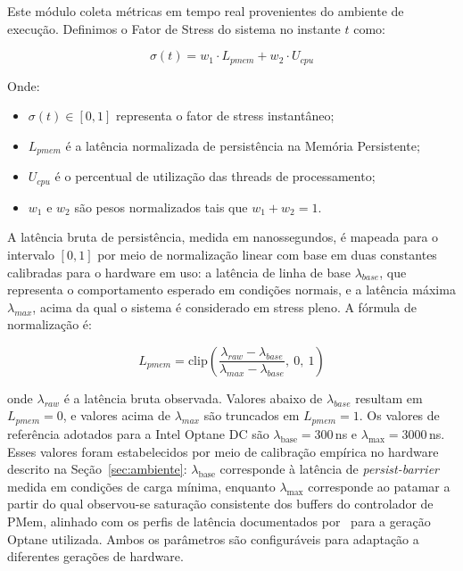 Este módulo coleta métricas em tempo real provenientes do ambiente de execução.
Definimos o Fator de Stress do sistema no instante $t$ como:

\begin{equation}
    \sigma(t) = w_1 \cdot L_{pmem} + w_2 \cdot U_{cpu}
    \label{eq:stress}
\end{equation}

\noindent Onde:
\begin{itemize}
    \item $\sigma(t) \in [0, 1]$ representa o fator de stress instantâneo;
    \item $L_{pmem}$ é a latência normalizada de persistência na Memória Persistente;
    \item $U_{cpu}$ é o percentual de utilização das threads de processamento;
    \item $w_1$ e $w_2$ são pesos normalizados tais que $w_1 + w_2 = 1$.
\end{itemize}

A latência bruta de persistência, medida em nanossegundos, é mapeada para o
intervalo $[0, 1]$ por meio de normalização linear com base em duas constantes
calibradas para o hardware em uso: a latência de linha de base $\lambda_{base}$,
que representa o comportamento esperado em condições normais, e a latência máxima
$\lambda_{max}$, acima da qual o sistema é considerado em stress pleno. A fórmula
de normalização é:

\begin{equation}
    L_{pmem} = \text{clip}\left(\frac{\lambda_{raw} - \lambda_{base}}
    {\lambda_{max} - \lambda_{base}},\ 0,\ 1\right)
    \label{eq:normalization}
\end{equation}

\noindent onde $\lambda_{raw}$ é a latência bruta observada. Valores abaixo de
$\lambda_{base}$ resultam em $L_{pmem} = 0$, e valores acima de $\lambda_{max}$
são truncados em $L_{pmem} = 1$. Os valores de referência adotados para a Intel Optane DC são
$\lambda_{\text{base}} = 300$\,ns e $\lambda_{\text{max}} = 3000$\,ns.
Esses valores foram estabelecidos por meio de calibração empírica no hardware
descrito na Seção~\ref{sec:ambiente}: $\lambda_{\text{base}}$ corresponde à
latência de \textit{persist-barrier} medida em condições de carga mínima,
enquanto $\lambda_{\text{max}}$ corresponde ao patamar a partir do qual
observou-se saturação consistente dos buffers do controlador de PMem, alinhado
com os perfis de latência documentados por~\cite{van_renen_2020} para a geração
Optane utilizada. Ambos os parâmetros são configuráveis para adaptação a
diferentes gerações de hardware.

